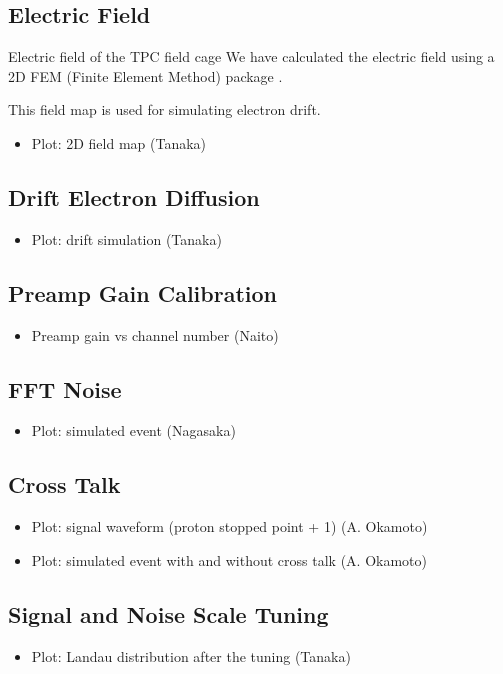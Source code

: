 \subsection{Electric Field}

Electric field of the TPC field cage
We have calculated the electric field using a 2D FEM (Finite Element Method) package \cite{Ref:FEMTET}.

This field map is used for simulating electron drift.


\begin{itemize}
\item Plot: 2D field map  (Tanaka)
\end{itemize}

\subsection{Drift Electron Diffusion}
\begin{itemize}
\item Plot: drift simulation  (Tanaka)
\end{itemize}

\subsection{Preamp Gain Calibration}
\begin{itemize}
\item Preamp gain vs channel number  (Naito)
\end{itemize}

\subsection{FFT Noise}
\begin{itemize}
\item Plot: simulated event  (Nagasaka)
\end{itemize}

\subsection{Cross Talk}
\begin{itemize}
\item Plot: signal waveform (proton stopped point + 1)  (A. Okamoto)
\item Plot: simulated event with and without cross talk (A. Okamoto)
\end{itemize}

\subsection{Signal and Noise Scale Tuning}
\begin{itemize}
\item Plot: Landau distribution after the tuning  (Tanaka)
\end{itemize}

